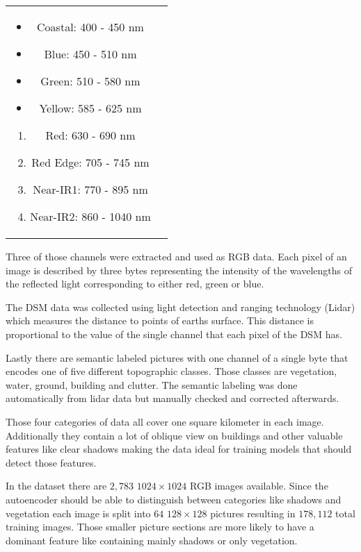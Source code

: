 \begin{tabular} {c c}
    \parbox{5cm}{
        \begin{itemize}
            \item Coastal: 400 - 450 nm 			
            \item Blue: 450 - 510 nm			
            \item Green: 510 - 580 nm 			
            \item Yellow: 585 - 625 nm
        \end{itemize}
    }
    \parbox{5cm}{
        \begin{enumerate} 			
            \item Red: 630 - 690 nm
            \item Red Edge: 705 - 745 nm
            \item Near-IR1: 770 - 895 nm
            \item Near-IR2: 860 - 1040 nm
        \end{enumerate}
    }
\end{tabular}
\bigskip

Three of those channels were extracted and used as RGB data. 
Each pixel of an image is described by three bytes representing the intensity of the wavelengths of the 
reflected light corresponding to either red, green or blue.

The DSM data was collected using light detection and ranging technology (Lidar) which measures the 
distance to points of earths surface. This distance is proportional to the value of the single channel
that each pixel of the DSM has.

Lastly there are semantic labeled pictures with one channel of a single byte that encodes one of five 
different topographic classes. Those classes are vegetation, water, ground, building and clutter. 
The semantic labeling was done automatically from lidar data but manually checked and corrected afterwards.

Those four categories of data all cover one square kilometer in each image.
Additionally they contain a lot of oblique view on buildings and other valuable
features like clear shadows making the data ideal for training models that should 
detect those features.

In the dataset there are $2,783$ $1024\times 1024$ RGB images available. Since the autoencoder should
be able to distinguish between categories like shadows and vegetation each image is split into $64$
$128\times 128$ pictures resulting in $178,112$ total training images. Those smaller picture sections
are more likely to have a dominant feature like containing mainly shadows or only vegetation.

